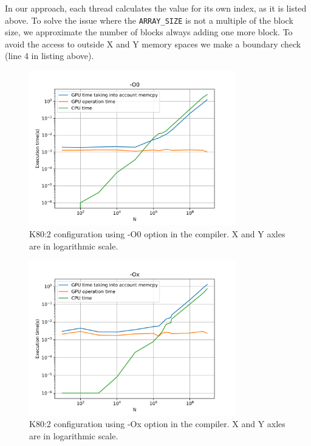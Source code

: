 \documentclass[12pt]{article}
\begin{document}

In our approach, each thread calculates the value for its own index, as it is listed above. To solve the issue where the \texttt{ARRAY\_SIZE} is not a multiple of the block size, we approximate the number of blocks always adding one more block. To avoid the access to outside X and Y  memory spaces we make a boundary check (line 4 in listing above).

\begin{figure}[H]
\centering
\includegraphics[width=0.8\textwidth]{O0.png}
\caption{K80:2 configuration using -O0 option in the compiler. X and Y axles are in logarithmic scale.}
\label{fig:O0}
\end{figure}


\begin{figure}[H]
  \centering
  \includegraphics[width=0.8\textwidth]{O1.png}
  \caption{K80:2 configuration using -Ox option in the compiler. X and Y axles are in logarithmic scale.}
  \label{fig:Ox}
  \end{figure}
  
\end{document}
